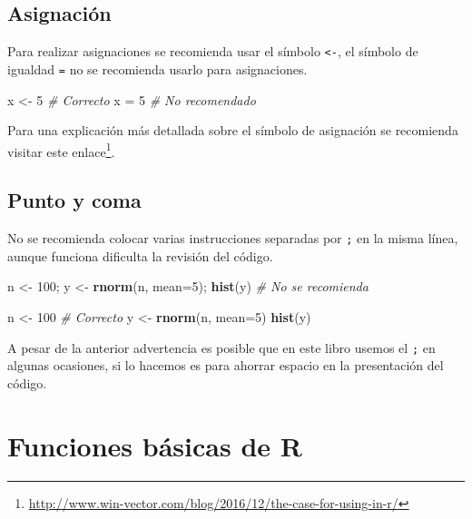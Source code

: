 \documentclass[10pt,]{krantz}
\makeatletter
\newenvironment{Shaded}{\begin{snugshade}}{\end{snugshade}}
\newcommand{\KeywordTok}[1]{\textcolor[rgb]{0.13,0.29,0.53}{\textbf{#1}}}
\newcommand{\DataTypeTok}[1]{\textcolor[rgb]{0.13,0.29,0.53}{#1}}
\newcommand{\DecValTok}[1]{\textcolor[rgb]{0.00,0.00,0.81}{#1}}
\newcommand{\StringTok}[1]{\textcolor[rgb]{0.31,0.60,0.02}{#1}}
\newcommand{\CommentTok}[1]{\textcolor[rgb]{0.56,0.35,0.01}{\textit{#1}}}
\newcommand{\NormalTok}[1]{#1}
\renewcommand{\href}[2]{#2\footnote{\url{#1}}}
\newenvironment{kframe}{%
\medskip{}
\setlength{\fboxsep}{.8em}
 \def\at@end@of@kframe{}%
 \ifinner\ifhmode%
  \def\at@end@of@kframe{\end{minipage}}%
  \begin{minipage}{\columnwidth}%
 \fi\fi%
 \def\FrameCommand##1{\hskip\@totalleftmargin \hskip-\fboxsep
 \colorbox{shadecolor}{##1}\hskip-\fboxsep
     \hskip-\linewidth \hskip-\@totalleftmargin \hskip\columnwidth}%
 \MakeFramed {\advance\hsize-\width
   \@totalleftmargin\z@ \linewidth\hsize
   \@setminipage}}%
 {\par\unskip\endMakeFramed%
 \at@end@of@kframe}
\renewenvironment{Shaded}{\begin{kframe}}{\end{kframe}}
\makeatother
\begin{document}
\section{Asignación}\label{asignacion}

Para realizar asignaciones se recomienda usar el símbolo
\texttt{\textless{}-}, el símbolo de igualdad \texttt{=} no se
recomienda usarlo para asignaciones.

\begin{Shaded}
\begin{Highlighting}[]
\NormalTok{x <-}\StringTok{ }\DecValTok{5}  \CommentTok{# Correcto}
\NormalTok{x =}\StringTok{ }\DecValTok{5}   \CommentTok{# No recomendado}
\end{Highlighting}
\end{Shaded}

Para una explicación más detallada sobre el símbolo de asignación se
recomienda visitar este
\href{http://www.win-vector.com/blog/2016/12/the-case-for-using-in-r/}{enlace}.

\section{Punto y coma}\label{punto-y-coma}

No se recomienda colocar varias instrucciones separadas por \texttt{;}
en la misma línea, aunque funciona dificulta la revisión del código.

\begin{Shaded}
\begin{Highlighting}[]
\NormalTok{n <-}\StringTok{ }\DecValTok{100}\NormalTok{; y <-}\StringTok{ }\KeywordTok{rnorm}\NormalTok{(n, }\DataTypeTok{mean=}\DecValTok{5}\NormalTok{); }\KeywordTok{hist}\NormalTok{(y)  }\CommentTok{# No se recomienda}

\NormalTok{n <-}\StringTok{ }\DecValTok{100}                                  \CommentTok{# Correcto}
\NormalTok{y <-}\StringTok{ }\KeywordTok{rnorm}\NormalTok{(n, }\DataTypeTok{mean=}\DecValTok{5}\NormalTok{)}
\KeywordTok{hist}\NormalTok{(y)}
\end{Highlighting}
\end{Shaded}

A pesar de la anterior advertencia es posible que en este libro usemos
el \texttt{;} en algunas ocasiones, si lo hacemos es para ahorrar
espacio en la presentación del código.

\chapter{Funciones básicas de R}\label{funbas}
\end{document}
